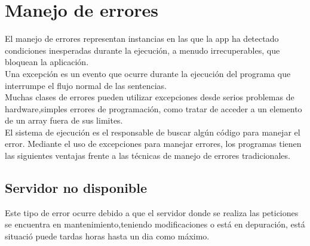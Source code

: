 \chapter{Manejo de errores}
El manejo de errores  representan instancias en las que la app ha detectado condiciones inesperadas durante la ejecuci\'on, a menudo irrecuperables, que bloquean la aplicaci\'on.\\ 
Una excepci\'on es un evento que ocurre durante la ejecuci\'on del programa que interrumpe el flujo normal de las sentencias.\\
Muchas clases de errores pueden utilizar excepciones desde serios problemas de hardware,simples errores de programaci\'on, como tratar de acceder a un elemento de un array fuera de sus limites. \\
El sistema de ejecuci\'on es el responsable de buscar alg\'un c\'odigo para manejar el error. 
Mediante el uso de excepciones para manejar errores, los programas  tienen las siguientes ventajas frente a las t\'ecnicas de manejo de errores tradicionales.
\section{Servidor no disponible}
Este tipo de error ocurre debido a que el servidor donde se realiza las peticiones se encuentra en mantenimiento,teniendo modificaciones o est\'a en depuraci\'on, est\'a situaci\'o puede tardas horas hasta un dia como m\'aximo.
